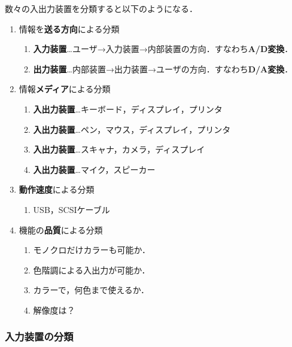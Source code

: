 数々の入出力装置を分類すると以下のようになる．
\begin{enumerate}[label=\textbf{(\alph*)}, labelsep=10pt, leftmargin=23pt]
	\item 情報を\textbf{送る方向}による分類
		\begin{enumerate}[label={\color{gray}●}, labelsep=10pt, leftmargin=23pt]
			\item \textbf{入力装置}…ユーザ→入力装置→内部装置の方向．すなわち\textbf{A/D変換}．
			\item \textbf{出力装置}…内部装置→出力装置→ユーザの方向．すなわち\textbf{D/A変換}．
		\end{enumerate}
	\item 情報\textbf{メディア}による分類
		\begin{enumerate}[label={\color{gray}●}, labelsep=10pt, leftmargin=23pt]
			\item \textbf{入出力装置}…キーボード，ディスプレイ，プリンタ
			\item \textbf{入出力装置}…ペン，マウス，ディスプレイ，プリンタ
			\item \textbf{入出力装置}…スキャナ，カメラ，ディスプレイ
			\item \textbf{入出力装置}…マイク，スピーカー
		\end{enumerate}
	\item \textbf{動作速度}による分類
		\begin{enumerate}[label={\color{gray}●}, labelsep=10pt, leftmargin=23pt]
			\item USB，SCSIケーブル
		\end{enumerate}
	\item 機能の\textbf{品質}による分類
		\begin{enumerate}[label={\color{gray}●}, labelsep=10pt, leftmargin=23pt]
			\item モノクロだけカラーも可能か．
			\item 色階調による入出力が可能か．
			\item カラーで，何色まで使えるか．
			\item 解像度は？
		\end{enumerate}
\end{enumerate}



\subsubsection{入力装置の分類}\label{sec:com_arch-3-B-3}

